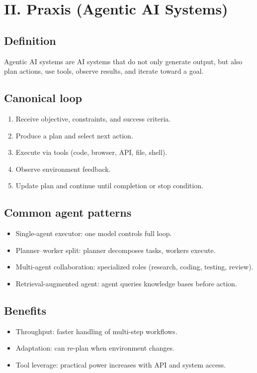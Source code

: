\documentclass[10pt]{article}
\begin{document}
\section*{II. Praxis (Agentic AI Systems)}

\subsection*{Definition}
Agentic AI systems are AI systems that do not only generate output, but also plan actions, use tools, observe results, and iterate toward a goal.

\subsection*{Canonical loop}
\begin{enumerate}
  \item Receive objective, constraints, and success criteria.
  \item Produce a plan and select next action.
  \item Execute via tools (code, browser, API, file, shell).
  \item Observe environment feedback.
  \item Update plan and continue until completion or stop condition.
\end{enumerate}

\subsection*{Common agent patterns}
\begin{itemize}
  \item Single-agent executor: one model controls full loop.
  \item Planner--worker split: planner decomposes tasks, workers execute.
  \item Multi-agent collaboration: specialized roles (research, coding, testing, review).
  \item Retrieval-augmented agent: agent queries knowledge bases before action.
\end{itemize}

\subsection*{Benefits}
\begin{itemize}
  \item Throughput: faster handling of multi-step workflows.
  \item Adaptation: can re-plan when environment changes.
  \item Tool leverage: practical power increases with API and system access.
\end{itemize}
\end{document}
